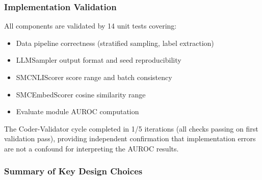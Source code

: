 \subsubsection{Implementation Validation}

All components are validated by 14 unit tests covering:
\begin{itemize}
\item Data pipeline correctness (stratified sampling, label extraction)
\item LLMSampler output format and seed reproducibility
\item SMCNLIScorer score range and batch consistency
\item SMCEmbedScorer cosine similarity range
\item Evaluate module AUROC computation
\end{itemize}

The Coder-Validator cycle completed in 1/5 iterations (all checks passing on first validation pass), providing independent confirmation that implementation errors are not a confound for interpreting the AUROC results.

\subsubsection{Summary of Key Design Choices}

\begin{table}[htbp]
\centering
{}
\end{table}

